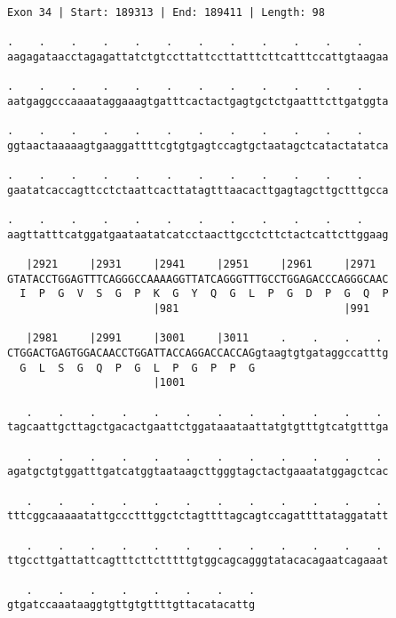 \documentclass{article}
\begin{document}
\newpage
\begin{Verbatim}
Exon 34 | Start: 189313 | End: 189411 | Length: 98
 
.    .    .    .    .    .    .    .    .    .    .    .    
aagagataacctagagattatctgtccttattccttatttcttcatttccattgtaagaa
  
.    .    .    .    .    .    .    .    .    .    .    .    
aatgaggcccaaaataggaaagtgatttcactactgagtgctctgaatttcttgatggta
  
.    .    .    .    .    .    .    .    .    .    .    .    
ggtaactaaaaagtgaaggattttcgtgtgagtccagtgctaatagctcatactatatca
  
.    .    .    .    .    .    .    .    .    .    .    .    
gaatatcaccagttcctctaattcacttatagtttaacacttgagtagcttgctttgcca
  
.    .    .    .    .    .    .    .    .    .    .    .    
aagttatttcatggatgaataatatcatcctaacttgcctcttctactcattcttggaag
  
   |2921     |2931     |2941     |2951     |2961     |2971  
GTATACCTGGAGTTTCAGGGCCAAAAGGTTATCAGGGTTTGCCTGGAGACCCAGGGCAAC
  I  P  G  V  S  G  P  K  G  Y  Q  G  L  P  G  D  P  G  Q  P
                       |981                          |991   
  
   |2981     |2991     |3001     |3011     .    .    .    . 
CTGGACTGAGTGGACAACCTGGATTACCAGGACCACCAGgtaagtgtgataggccatttg
  G  L  S  G  Q  P  G  L  P  G  P  P  G                     
                       |1001                                
  
   .    .    .    .    .    .    .    .    .    .    .    . 
tagcaattgcttagctgacactgaattctggataaataattatgtgtttgtcatgtttga
  
   .    .    .    .    .    .    .    .    .    .    .    . 
agatgctgtggatttgatcatggtaataagcttgggtagctactgaaatatggagctcac
  
   .    .    .    .    .    .    .    .    .    .    .    . 
tttcggcaaaaatattgccctttggctctagttttagcagtccagattttataggatatt
  
   .    .    .    .    .    .    .    .    .    .    .    . 
ttgccttgattattcagtttcttctttttgtggcagcagggtatacacagaatcagaaat
  
   .    .    .    .    .    .    .    .
gtgatccaaataaggtgttgtgttttgttacatacattg
\end{Verbatim}
\newpage
\end{document}
